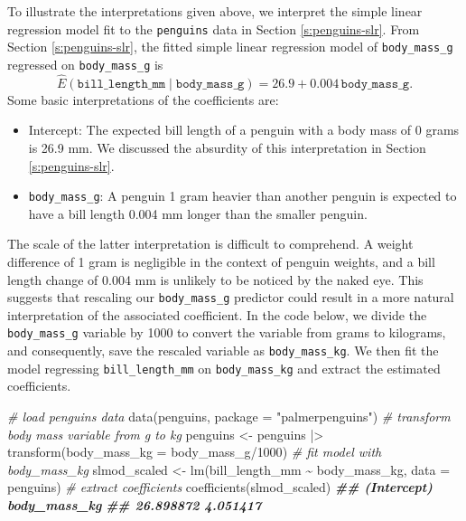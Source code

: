 \documentclass[
]{book}
\newenvironment{Shaded}{\begin{snugshade}}{\end{snugshade}}
\newcommand{\AttributeTok}[1]{\textcolor[rgb]{0.77,0.63,0.00}{#1}}
\newcommand{\CommentTok}[1]{\textcolor[rgb]{0.56,0.35,0.01}{\textit{#1}}}
\newcommand{\DecValTok}[1]{\textcolor[rgb]{0.00,0.00,0.81}{#1}}
\newcommand{\DocumentationTok}[1]{\textcolor[rgb]{0.56,0.35,0.01}{\textbf{\textit{#1}}}}
\newcommand{\FunctionTok}[1]{\textcolor[rgb]{0.00,0.00,0.00}{#1}}
\newcommand{\NormalTok}[1]{#1}
\newcommand{\OtherTok}[1]{\textcolor[rgb]{0.56,0.35,0.01}{#1}}
\newcommand{\SpecialCharTok}[1]{\textcolor[rgb]{0.00,0.00,0.00}{#1}}
\newcommand{\StringTok}[1]{\textcolor[rgb]{0.31,0.60,0.02}{#1}}
\providecommand{\tightlist}{%
  \setlength{\itemsep}{0pt}\setlength{\parskip}{0pt}}
\theoremstyle{definition}
\theoremstyle{definition}
\theoremstyle{definition}
\theoremstyle{definition}
\theoremstyle{remark}
\begin{document}
To illustrate the interpretations given above, we interpret the simple
linear regression model fit to the \texttt{penguins} data in Section
\ref{s:penguins-slr}. From Section \ref{s:penguins-slr}, the fitted
simple linear regression model of \texttt{body\_mass\_g} regressed on
\texttt{body\_mass\_g} is \[
\hat{E}(\mathtt{bill\_length\_mm}\mid \mathtt{body\_mass\_g})=26.9+0.004 \label{eq:slr-penguin-orig} \,\mathtt{body\_mass\_g}.
\] Some basic interpretations of the coefficients are:

\begin{itemize}
\tightlist
\item
  Intercept: The expected bill length of a penguin with a body mass of
  0 grams is 26.9 mm. We discussed the absurdity of this
  interpretation in Section \ref{s:penguins-slr}.
\item
  \texttt{body\_mass\_g}: A penguin 1 gram heavier than another penguin is
  expected to have a bill length 0.004 mm longer than the smaller
  penguin.
\end{itemize}

The scale of the latter interpretation is difficult to comprehend. A
weight difference of 1 gram is negligible in the context of penguin
weights, and a bill length change of 0.004 mm is unlikely to be noticed
by the naked eye. This suggests that rescaling our \texttt{body\_mass\_g}
predictor could result in a more natural interpretation of the
associated coefficient. In the code below, we divide the \texttt{body\_mass\_g}
variable by 1000 to convert the variable from grams to kilograms, and
consequently, save the rescaled variable as \texttt{body\_mass\_kg}. We then fit
the model regressing \texttt{bill\_length\_mm} on \texttt{body\_mass\_kg} and extract the
estimated coefficients.

\begin{Shaded}
\begin{Highlighting}[]
\CommentTok{\# load penguins data}
\FunctionTok{data}\NormalTok{(penguins, }\AttributeTok{package =} \StringTok{"palmerpenguins"}\NormalTok{)}
\CommentTok{\# transform body mass variable from g to kg}
\NormalTok{penguins }\OtherTok{\textless{}{-}}\NormalTok{ penguins }\SpecialCharTok{|\textgreater{}} \FunctionTok{transform}\NormalTok{(}\AttributeTok{body\_mass\_kg =}\NormalTok{ body\_mass\_g}\SpecialCharTok{/}\DecValTok{1000}\NormalTok{)}
\CommentTok{\# fit model with body\_mass\_kg}
\NormalTok{slmod\_scaled }\OtherTok{\textless{}{-}} \FunctionTok{lm}\NormalTok{(bill\_length\_mm }\SpecialCharTok{\textasciitilde{}}\NormalTok{ body\_mass\_kg, }\AttributeTok{data =}\NormalTok{ penguins)}
\CommentTok{\# extract coefficients}
\FunctionTok{coefficients}\NormalTok{(slmod\_scaled)}
\DocumentationTok{\#\#  (Intercept) body\_mass\_kg }
\DocumentationTok{\#\#    26.898872     4.051417}
\end{Highlighting}
\end{Shaded}
\end{document}
